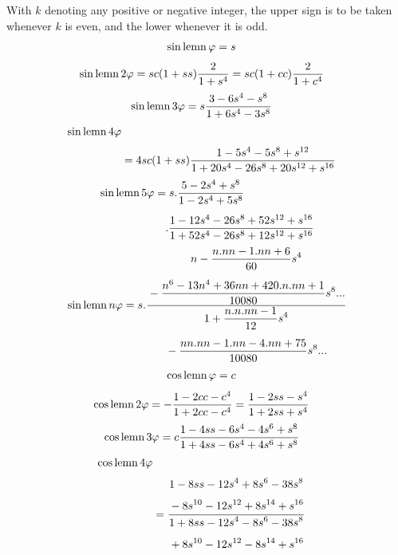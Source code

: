 With $k$ denoting any positive or negative integer, the upper sign is to be taken whenever $k$ is even, and the lower whenever it is odd.
\[
\begin{aligned}\operatorname{sin\,lemn}\varphi&=s\end{aligned}
\]
\[
\begin{aligned}\operatorname{sin\,lemn}2\varphi&=sc(1+ss)\dfrac2{1+s^4}=sc(1+cc)\dfrac2{1+c^4}\end{aligned}
\]
\[
\begin{aligned}\operatorname{sin\,lemn}3\varphi&=s\dfrac{3-6s^4-s^8}{1+6s^4-3s^8}\end{aligned}
\]
\[
\begin{aligned}\operatorname{sin\,lemn}4\varphi\\[3pt]&=4sc(1+ss)\dfrac{1-5s^4-5s^8+s^{12}}{1+20s^4-26s^8+20s^{12}+s^{16}}\end{aligned}
\]
\[
\begin{aligned}\operatorname{sin\,lemn}5\varphi&=s.\dfrac{5-2s^4+s^8}{1-2s^4+5s^8}\\[5pt]&\quad .\dfrac{1-12s^4-26s^8+52s^{12}+s^{16}}{1+52s^4-26s^8+12s^{12}+s^{16}}\end{aligned}
\]
\[
\operatorname{sin\,lemn} n\varphi=s.\dfrac{\begin{gathered}n-\dfrac{n.nn-1.nn+6}{60}s^4\\[5pt]{}-\dfrac{n^6-13n^4+36nn+420.n.nn+1}{10080}s^8\mathord{.}\mathord{.}\mathord{.}\end{gathered}}{\begin{gathered}1+\dfrac{n.n.nn-1}{12}s^4\\[5pt]{}-\dfrac{nn.nn-1.nn-4.nn+75}{10080}s^8\mathord{.}\mathord{.}\mathord{.}\end{gathered}}
\]
\[
\begin{aligned}\operatorname{cos\,lemn}\varphi&=c\end{aligned}
\]
\[
\begin{aligned}\operatorname{cos\,lemn}2\varphi&=-\dfrac{1-2cc-c^4}{1+2cc-c^4}=\dfrac{1-2ss-s^4}{1+2ss+s^4}\end{aligned}
\]
\[
\begin{aligned}\operatorname{cos\,lemn}3\varphi&=c\dfrac{1-4ss-6s^4-4s^6+s^8}{1+4ss-6s^4+4s^6+s^8}\end{aligned}
\]
\[
\begin{aligned}\operatorname{cos\,lemn}4\varphi\\[3pt]&=\dfrac{\begin{gathered}1-8ss-12s^4+8s^6-38s^8\\[3pt]{}-8s^{10}-12s^{12}+8s^{14}+s^{16}\end{gathered}}{\begin{gathered}1+8ss-12s^4-8s^6-38s^8\\[3pt]{}+8s^{10}-12s^{12}-8s^{14}+s^{16}\end{gathered}}\end{aligned}
\]
